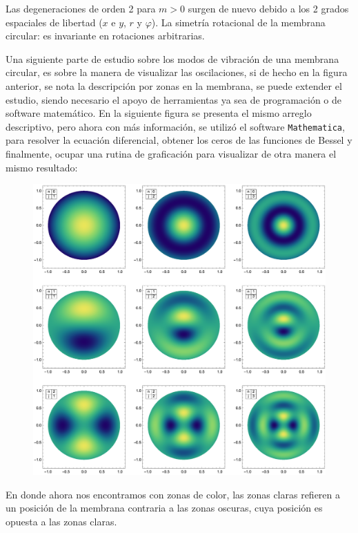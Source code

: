 Las degeneraciones de orden 2 para $m > 0$ surgen de nuevo debido a los 2 grados espaciales de libertad ($x$ e $y$, $r$ y $\varphi$). La simetría rotacional de la membrana circular: es invariante en rotaciones arbitrarias.
\par
Una siguiente parte de estudio sobre los modos de vibración de una membrana circular, es sobre la manera de visualizar las oscilaciones, si de hecho en la figura anterior, se nota la descripción por zonas en la membrana, se puede extender el estudio, siendo necesario el apoyo de herramientas ya sea de programación o de software matemático. En la siguiente figura se presenta el mismo arreglo descriptivo, pero ahora con más información, se utilizó el  software \texttt{Mathematica}, para resolver la ecuación diferencial, obtener los ceros de las funciones de Bessel y finalmente, ocupar una rutina de graficación para visualizar de otra manera el mismo resultado:
\begin{figure}[H]
    \centering
    \includegraphics[scale=0.8]{Imagenes/Modos_Vibracion_Membrana_Circular_01.eps}
\end{figure}
En donde ahora nos encontramos con zonas de color, las zonas claras refieren a un posición de la membrana contraria a las zonas oscuras, cuya posición es opuesta a las zonas claras.
